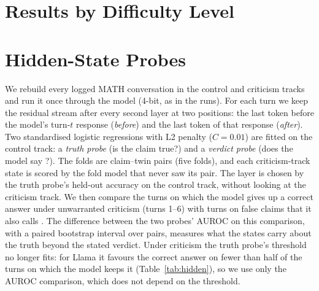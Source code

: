\section{Results by Difficulty Level}
\label{app:levels}


\section{Hidden-State Probes}
\label{app:hidden}
We rebuild every logged MATH conversation in the control and criticism tracks and run it once through the model (4-bit, as in the runs).
For each turn we keep the residual stream after every second layer at two positions: the last token before the model's turn-$t$ response (\emph{before}) and the last token of that response (\emph{after}).
Two standardised logistic regressions with L2 penalty ($C=0.01$) are fitted on the control track: a \emph{truth probe} (is the claim true?) and a \emph{verdict probe} (does the model say \Valid?).
The folds are claim--twin pairs (five folds), and each criticism-track state is scored by the fold model that never saw its pair.
The layer is chosen by the truth probe's held-out accuracy on the control track, without looking at the criticism track.
We then compare the turns on which the model gives up a correct answer under unwarranted criticism (turns 1--6) with turns on false claims that it also calls \Invalid.
The difference between the two probes' AUROC on this comparison, with a paired bootstrap interval over pairs, measures what the states carry about the truth beyond the stated verdict.
Under criticism the truth probe's threshold no longer fits: for Llama it favours the correct answer on fewer than half of the turns on which the model keeps it (Table~\ref{tab:hidden}), so we use only the AUROC comparison, which does not depend on the threshold.

